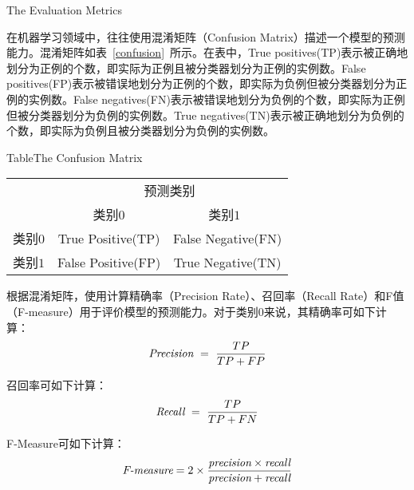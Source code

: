 {The Evaluation Metrics}
\label{ref-creatingmetrics}

在机器学习领域中，往往使用混淆矩阵（Confusion Matrix）描述一个模型的预测能力。混淆矩阵如表~\ref{confusion}~所示。在表中，True positives(TP)表示被正确地划分为正例的个数，即实际为正例且被分类器划分为正例的实例数。False positives(FP)表示被错误地划分为正例的个数，即实际为负例但被分类器划分为正例的实例数。False negatives(FN)表示被错误地划分为负例的个数，即实际为正例但被分类器划分为负例的实例数。True negatives(TN)表示被正确地划分为负例的个数，即实际为负例且被分类器划分为负例的实例数。　　​

\begin{table}[htbp]
{Table$\!$}{The Confusion Matrix}
\vspace{0.5em}
\centering
\wuhao
\begin{tabular}{ccc}
\toprule[1.5pt]
~\multirow{2}{*}{真实类别}& \multicolumn{2}{c}{预测类别} ~\\ 
 \cline{2-3}
~&{类别$0$} &{类别$1$}~\\
\midrule[1pt]
类别$0$&True Positive(TP)	&False Negative(FN)\\
类别$1$&False Positive(FP)	&True Negative(TN)\\
\bottomrule[1.5pt]
\end{tabular}
\end{table}

根据混淆矩阵，使用计算精确率（Precision Rate）、召回率（Recall Rate）和F值（F-measure）用于评价模型的预测能力。对于类别$0$来说，其精确率可如下计算：
\begin{equation} 
\mbox{\it Precision}~=~{\frac {TP}{TP+FP}}
 \end{equation}
 
召回率可如下计算：
\begin{equation} 
\mbox{\it Recall}~=~{\frac {TP}{TP+FN}}
 \end{equation}

F-Measure可如下计算：
\begin{equation} 
\mbox{\it F-measure} =2 \times {\frac {\mbox{\it precision} \times \mbox{\it recall} }{ \mbox{\it precision} + \mbox{\it recall} } }
 \end{equation}

